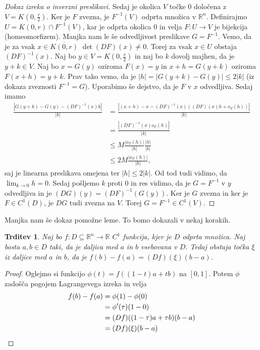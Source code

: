 \documentclass[10pt, a4paper]{article}
\newtheorem{trditev}[izr]{Trditev}
\newenvironment{noticeC}{%
  \tcolorbox[%
  notitle,
  empty,
  enhanced,  %
  breakable,
  coltext=black, 
  fontupper=\rmfamily,
  parbox=false,
  noparskip,
  sharp corners,
  boxrule=-1pt,  %
  frame hidden,
  left=7pt,  %
  right=7pt,
  top=5pt,
  bottom=5pt,
  before skip=2.5ex plus 2pt,
  after skip=2.5ex plus 2pt,
  overlay unbroken and last={%
  },
  ]}
{\endtcolorbox}
\newenvironment{dokaz}%
  {\begin{noticeC}\begin{proof}}%
  {\end{proof}\end{noticeC}}
\newcommand{\R}{\mathbb {R}}
\begin{document}
\begin{dokaz}[Dokaz izreka o inverzni preslikavi]
    Sedaj je okolica $V$ točke $0$ določena z $V = K \left(0, \frac{r}{2}\right)$.
    Ker je $F$ zvezna, je $F^{-1} (V)$ odprta množica v $\R^n$.
    Definirajmo $U = K(0, r) \cap F^{-1} (V)$,
    kar je odprta okolica $0$ in velja $F: U \to V$ je bijekcija (homeomorfizem).
    Manjka nam le še odvedljivost preslikave $G = F^{-1}$.
    Vemo, da je za vsak $x \in \overline{K(0, r)}$ $\det (DF) (x) \neq 0$.
    Torej za vsak $x \in U$ obstaja $(DF)^{-1} (x)$.
    Naj bo $y \in V = K\left(0, \frac{r}{2}\right)$ in naj bo $k$ dovolj majhen, da je 
    $y + k \in V$. Naj bo $x = G(y)$ oziroma $F(x) = y$ in $x + h = G(y + k)$ oziroma $F(x + h) = y + k$.
    Prav tako vemo, da je $|h| = |G(y + k) - G(y)| \leq 2 |k|$ (iz dokaza zveznosti $F^{-1} = G$).
    Uporabimo še dejstvo, da je $F$ v $x$ odvedljiva.
    Sedaj imamo 
    \begin{align*}
        \frac{|G(y + k) - G(y) - (DF)^{-1} (x) k|}{|k|} &= \frac{|(x + h) - x - (DF)^{-1} (x) ((DF)(x) h + o_F (h))|}{|k|}\\
        &= \frac{|(DF)^{-1} (x) o_F (h)|}{|k|}\\
        &\leq M \frac{|o_F (h)|}{|h|} \frac{|h|}{|k|}\\
        &\leq 2M \frac{|o_F (h)|}{|h|},
    \end{align*}
    saj je linearna preslikava omejena ter $|h| \leq 2|k|$.
    Od tod tudi vidimo, da $\lim_{k \to 0} h = 0.$
    Sedaj pošljemo $k$ proti $0$ in res vidimo, da je $G = F^{-1}$ v $y$ odvedljiva
    in je $(DG) (y) = (DF)^{-1} (G(y))$.
    Ker je $G$ zvezna in ker je $F \in C^1 (D)$, je $DG$ tudi zvezna na $V$.
    Torej $G = F^{-1} \in C^1 (V)$.
\end{dokaz}

Manjka nam še dokaz pomožne leme. To bomo dokazali v nekaj korakih.

\begin{trditev}
    Naj bo $f: D \subseteq \R^n \to \R$ $C^1$ funkcija, kjer je $D$ odprta množica.
    Naj bosta $a, b\in D$ taki, da je daljica med $a$ in $b$ vsebovana v $D$.
    Tedaj obstaja točka $\xi$ iz daljice med $a$ in $b$, da je $f(b) - f(a) = (Df) (\xi) (b - a)$. 
\end{trditev}

\begin{dokaz}
    Oglejmo si funkcijo $\phi(t) = f((1 - t)a + tb)$ na $[0, 1]$.
    Potem $\phi$ zadošča pogojem Lagrangevega izreka in velja 
    \begin{align*}
        f(b) - f(a) &= \phi(1) - \phi(0)\\
        &= \phi'(\tau) (1 - 0)\\
        &= (Df) ((1 - \tau)a + \tau b) (b - a)\\
        &= (Df) (\xi) (b - a) \qedhere
    \end{align*}
\end{dokaz}
\end{document}
